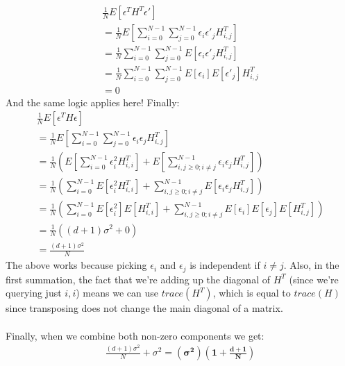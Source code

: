 \documentclass[12pt]{article}
\begin{document}
\begin{enumerate}[label=(\alph*)]
	\begin{gather*}
		\frac{1}{N}E[\epsilon^TH^T\epsilon']
		\\ = \frac{1}{N}E[\sum_{i=0}^{N-1}\sum_{j=0}^{N-1}\epsilon_i\epsilon'_jH^T_{i,j}]
		\\ = \frac{1}{N}\sum_{i=0}^{N-1}\sum_{j=0}^{N-1}E[\epsilon_i\epsilon'_jH^T_{i,j}]
		\\ = \frac{1}{N}\sum_{i=0}^{N-1}\sum_{j=0}^{N-1}E[\epsilon_i]E[\epsilon'_j]H^T_{i,j}
		\\ = 0
	\end{gather*}
	And the same logic applies here! Finally:
	\begin{gather*}
		\frac{1}{N}E[\epsilon^TH\epsilon]
		\\ = \frac{1}{N}E[\sum_{i=0}^{N-1}\sum_{j=0}^{N-1}\epsilon_i\epsilon_jH^T_{i,j}]
		\\ = \frac{1}{N}(E[\sum_{i=0}^{N-1}\epsilon_i^2H^T_{i,i}] + E[\sum_{i,j\ge0; i\neq j}^{N-1}\epsilon_i\epsilon_jH^T_{i,j}])
		\\ = \frac{1}{N}(\sum_{i=0}^{N-1}E[\epsilon_i^2H^T_{i,i}] + \sum_{i,j\ge0; i\neq j}^{N-1}E[\epsilon_i\epsilon_jH^T_{i,j}])
		\\ = \frac{1}{N}(\sum_{i=0}^{N-1}E[\epsilon_i^2]E[H^T_{i,i}] + \sum_{i,j\ge0; i\neq j}^{N-1}E[\epsilon_i]E[\epsilon_j]E[H^T_{i,j}])
		\\ = \frac{1}{N}((d+1)\sigma^2 + 0)
		\\ = \frac{(d+1)\sigma^2}{N}
	\end{gather*}
	The above works because picking $\epsilon_i$ and $\epsilon_j$ is independent if $i \neq j$. Also, in the first summation, the fact that we're adding up the diagonal of $H^T$ (since we're querying just $i,i$) means we can use $trace(H^T)$, which is equal to $trace(H)$ since transposing does not change the main diagonal of a matrix.
	\\ \\ Finally, when we combine both non-zero components we get:
	\begin{gather*}
		\frac{(d+1)\sigma^2}{N} + \sigma^2 = \boldsymbol{(\sigma^2)(1 + \frac{d + 1}{N})}
	\end{gather*}
\end{enumerate}
\end{document}
